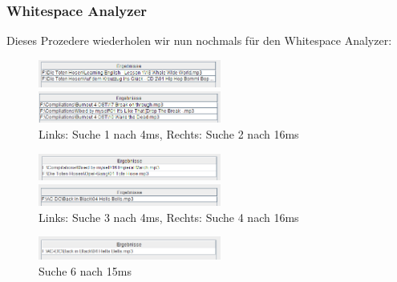 \documentclass[12pt,a4paper,ngerman]{report}
\begin{document}
\subsubsection{Whitespace Analyzer}
Dieses Prozedere wiederholen wir nun nochmals für den Whitespace Analyzer:
\begin{figure}[h!]
\centering
	\begin{minipage}[b]{7cm}
	\includegraphics[width=6cm]{img/search1_whiAn_4.PNG}
	\end{minipage}
	\begin{minipage}[b]{7cm}
	\includegraphics[width=6cm]{img/search2_whiAn_16.PNG}
	\end{minipage}
\caption{Links: Suche 1 nach 4ms, Rechts: Suche 2 nach 16ms\protect\footnotemark}
\end{figure}
\begin{figure}[h!]
\centering
	\begin{minipage}[b]{7cm}
	\includegraphics[width=6cm]{img/search3_whiAn_4.PNG}
	\end{minipage}
	\begin{minipage}[b]{7cm}
	\includegraphics[width=6cm]{img/search4_whiAn_16.PNG}
	\end{minipage}
\caption{Links: Suche 3 nach 4ms, Rechts: Suche 4 nach 16ms\protect\footnotemark}
\end{figure}
\begin{figure}[h!]
\centering
	\begin{minipage}[b]{7cm}
	\includegraphics[width=6cm]{img/search6_whiAn_15.PNG}
	\caption{Suche 6 nach 15ms\protect\footnotemark}
	\end{minipage}
\end{figure}
\newpage
\end{document}
